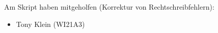 Am Skript haben mitgeholfen (Korrektur von Rechtschreibfehlern):
\begin{itemize}
\item Tony Klein (WI21A3)
\end{itemize}
